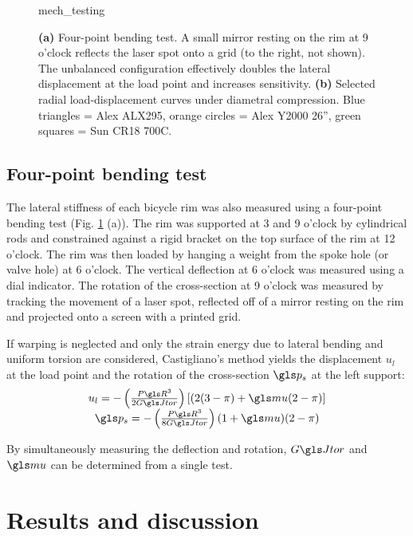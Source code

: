 \documentclass[../thesis.tex]{subfiles}
\begin{document}
\begin{figure}
  \centering
  {mech_testing}
  \caption{\textbf{(a)} Four-point bending test. A small mirror resting on the rim at 9 o’clock reflects the laser spot onto a grid (to the right, not shown). The unbalanced configuration effectively doubles the lateral displacement at the load point and increases sensitivity. \textbf{(b)} Selected radial load-displacement curves under diametral compression. Blue triangles = Alex ALX295, orange circles = Alex Y2000 26'', green squares = Sun CR18 700C.}
  \label{fig:mech_tests}
\end{figure}

\subsection{Four-point bending test}

The lateral stiffness of each bicycle rim was also measured using a four-point bending test \cite{Wilson2004} (Fig. \ref{fig:mech_tests} (a)). The rim was supported at 3 and 9 o'clock by cylindrical rods and constrained against a rigid bracket on the top surface of the rim at 12 o'clock. The rim was then loaded by hanging a weight from the spoke hole (or valve hole) at 6 o'clock. The vertical deflection at 6 o'clock was measured using a dial indicator. The rotation of the cross-section at 9 o'clock was measured by tracking the movement of a laser spot, reflected off of a mirror resting on the rim and projected onto a screen with a printed grid.

If warping is neglected and only the strain energy due to lateral bending and uniform torsion are considered, Castigliano's method yields the displacement $u_l$ at the load point and the rotation of the cross-section $\p_s$ at the left support:
\begin{equation}\label{eq:u_4p}
\begin{array}{c}
u_l = -\left(\frac{P\R^3}{2\GJ}\right) [(2(3-\pi)+\m(2-\pi)]\\
\p_s = -\left(\frac{P\R^3}{8\GJ}\right) (1+\m)(2-\pi)
\end{array}
\end{equation}

By simultaneously measuring the deflection and rotation, $\GJ$ and $\m$ can be determined from a single test.

\section{Results and discussion}
\end{document}
